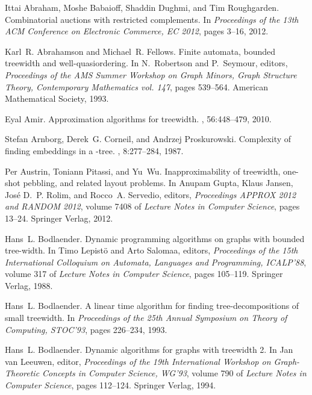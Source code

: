 \documentclass[a4paper,11pt]{article}
\theoremstyle{definition}
\theoremstyle{remark}
\begin{document}

\begin{thebibliography}{10}

Ittai Abraham, Moshe Babaioff, Shaddin Dughmi, and Tim Roughgarden.
\newblock Combinatorial auctions with restricted complements.
\newblock In {\em Proceedings of the 13th ACM Conference on Electronic
  Commerce, EC 2012}, pages 3--16, 2012.

Karl~R. Abrahamson and Michael~R. Fellows.
\newblock Finite automata, bounded treewidth and well-quasiordering.
\newblock In N.~Robertson and P.~Seymour, editors, {\em Proceedings of the AMS
  Summer Workshop on Graph Minors, Graph Structure Theory, Contemporary
  Mathematics vol. 147}, pages 539--564. American Mathematical Society, 1993.

Eyal Amir.
\newblock Approximation algorithms for treewidth.
, 56:448--479, 2010.

Stefan Arnborg, Derek~G. Corneil, and Andrzej Proskurowski.
\newblock Complexity of finding embeddings in a -tree.
, 8:277--284,
  1987.

Per Austrin, Toniann Pitassi, and Yu~Wu.
\newblock Inapproximability of treewidth, one-shot pebbling, and related layout
  problems.
\newblock In Anupam Gupta, Klaus Jansen, Jos{\'e} D.~P. Rolim, and Rocco~A.
  Servedio, editors, {\em Proceedings APPROX 2012 and RANDOM 2012}, volume 7408
  of {\em Lecture Notes in Computer Science}, pages 13--24. Springer Verlag,
  2012.

Hans~L. Bodlaender.
\newblock Dynamic programming algorithms on graphs with bounded tree-width.
\newblock In Timo Lepist\"{o} and Arto Salomaa, editors, {\em Proceedings of
  the 15th International Colloquium on Automata, Languages and Programming,
  ICALP'88}, volume 317 of {\em Lecture Notes in Computer Science}, pages
  105--119. Springer Verlag, 1988.

Hans~L. Bodlaender.
\newblock A linear time algorithm for finding tree-decompositions of small
  treewidth.
\newblock In {\em Proceedings of the 25th Annual Symposium on Theory of
  Computing, STOC'93}, pages 226--234, 1993.

Hans~L. Bodlaender.
\newblock Dynamic algorithms for graphs with treewidth 2.
\newblock In Jan van Leeuwen, editor, {\em Proceedings of the 19th
  International Workshop on Graph-Theoretic Concepts in Computer Science,
  WG'93}, volume 790 of {\em Lecture Notes in Computer Science}, pages
  112--124. Springer Verlag, 1994.


\end{thebibliography}
\end{document}
